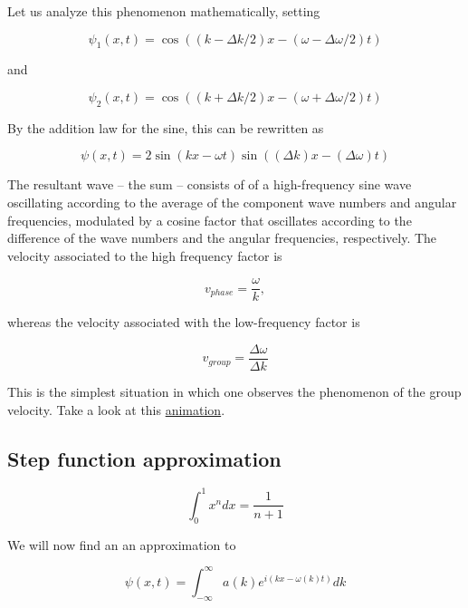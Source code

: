 Let us analyze this phenomenon mathematically, setting



\begin{equation}
\psi_1(x,t)  = \cos((k - \Delta k/2)x - (\omega - \Delta \omega/2)t)
\end{equation}

and

\begin{equation}
\psi_2(x,t)  = \cos((k + \Delta k/2)x - (\omega + \Delta \omega/2)t)
\end{equation}

By the addition law for the sine, this can be rewritten as

\begin{equation}
\psi(x,t) = 2\sin(kx - \omega t)\sin((\Delta k)x - (\Delta \omega)t)
\end{equation}


The resultant wave -- the sum -- consists of of a high-frequency sine wave oscillating according to the average of the component wave numbers and angular frequencies, modulated by a cosine factor that oscillates according to the difference of the wave numbers and the angular frequencies, respectively.  The velocity associated to the high frequency factor is 

\begin{equation}
v_{phase} = \frac{\omega}{k},
\end{equation}

whereas the velocity associated with the low-frequency factor is

\begin{equation}
v_{group} = \frac{\Delta \omega}{\Delta k}
\end{equation}

This is the simplest situation in which one observes the phenomenon of the group velocity.  Take a look at this \href{https://galileo.phys.virginia.edu/classes/109N/more_stuff/Applets/wavepacket/wavepacket.html}{animation}.


\subsection{Step function approximation}

$$
\int_0^1 x^n dx = \frac{1}{n+1}
$$


We will now find an an approximation to 

\begin{equation}
\psi(x,t) = \int_{-\infty}^\infty a(k) e^{i(kx - \omega(k)t)} dk
\end{equation}

